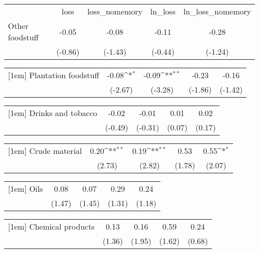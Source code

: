 {
\def\sym#1{\ifmmode^{#1}\else\(^{#1}\)\fi}
\begin{tabular}{l*{4}{c}}
                &\multicolumn{1}{c}{loss}&\multicolumn{1}{c}{loss\_nomemory}&\multicolumn{1}{c}{ln\_loss}&\multicolumn{1}{c}{ln\_loss\_nomemory}\\
[1em]
Other foodstuff &    -0.05         &    -0.08         &    -0.11         &    -0.28         \\
                &  (-0.86)         &  (-1.43)         &  (-0.44)         &  (-1.24)         \\
\end{tabular}
}
{
\def\sym#1{\ifmmode^{#1}\else\(^{#1}\)\fi}
\begin{tabular}{l*{4}{c}}
[1em]
Plantation foodstuff&    -0.08\sym{*}  &    -0.09\sym{**} &    -0.23         &    -0.16         \\
                &  (-2.67)         &  (-3.28)         &  (-1.86)         &  (-1.42)         \\
\end{tabular}
}
{
\def\sym#1{\ifmmode^{#1}\else\(^{#1}\)\fi}
\begin{tabular}{l*{4}{c}}
[1em]
Drinks and tobacco&    -0.02         &    -0.01         &     0.01         &     0.02         \\
                &  (-0.49)         &  (-0.31)         &   (0.07)         &   (0.17)         \\
\end{tabular}
}
{
\def\sym#1{\ifmmode^{#1}\else\(^{#1}\)\fi}
\begin{tabular}{l*{4}{c}}
[1em]
Crude material  &     0.20\sym{**} &     0.19\sym{**} &     0.53         &     0.55\sym{*}  \\
                &   (2.73)         &   (2.82)         &   (1.78)         &   (2.07)         \\
\end{tabular}
}
{
\def\sym#1{\ifmmode^{#1}\else\(^{#1}\)\fi}
\begin{tabular}{l*{4}{c}}
[1em]
Oils            &     0.08         &     0.07         &     0.29         &     0.24         \\
                &   (1.47)         &   (1.45)         &   (1.31)         &   (1.18)         \\
\end{tabular}
}
{
\def\sym#1{\ifmmode^{#1}\else\(^{#1}\)\fi}
\begin{tabular}{l*{4}{c}}
[1em]
Chemical products&     0.13         &     0.16         &     0.59         &     0.24         \\
                &   (1.36)         &   (1.95)         &   (1.62)         &   (0.68)         \\
\end{tabular}
}
